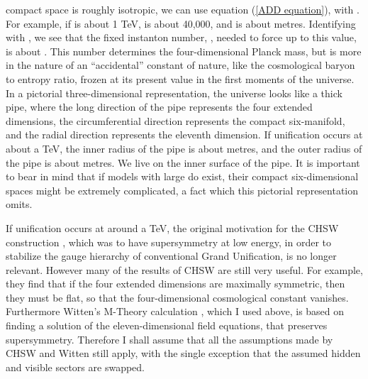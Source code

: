 \documentclass[a4paper,12pt,oneside]{article}
\begin{document}
compact space is roughly isotropic, we can use equation (\ref{ADD equation}),
with \coordHE{}.  For example, if \coordHE{} is 
about 1 TeV, \coordHE{} is about 40,000, and \coordHE{} is 
about \coordHE{} metres.  Identifying \coordHE{} with \coordHE{}, we see
that the fixed instanton number, \coordHE{}, needed to force \coordHE{} up 
to this value, is about \coordHE{}.  This number determines the 
four-dimensional Planck mass, but is more in the nature of an
``accidental'' constant of nature, like the cosmological baryon to
entropy ratio, frozen at its present value in the first moments of
the universe.  In a pictorial three-dimensional representation, the
universe looks like a thick pipe, where the long direction 
of the pipe represents the four extended dimensions, the 
circumferential direction represents the 
compact six-manifold, and the radial direction represents the 
eleventh 
dimension.  If unification occurs at about a TeV, the inner radius 
of the pipe is about \coordHE{} 
metres, and the outer radius of the pipe is about \coordHE{} 
metres.  We live on the inner surface of the pipe.  It is important 
to bear in mind that if models with large \coordHE{} do exist, 
their compact six-dimensional spaces might be extremely complicated,
a fact which this pictorial representation omits.

If unification occurs at around a TeV, the original motivation for
the CHSW construction \cite{CHSW}, which was to have \coordHE{} 
supersymmetry at low energy, in order to stabilize the gauge 
hierarchy of conventional Grand Unification, is no longer relevant.
However many of the results of CHSW are still very useful.
For example, they find that if the four extended dimensions are
maximally symmetric, then they must be flat, so that the 
four-dimensional cosmological constant vanishes.  Furthermore 
Witten's M-Theory calculation \cite{Witten}, which I used above, is
based on finding a solution of the eleven-dimensional field 
equations, that preserves supersymmetry.  Therefore I shall assume
that all the assumptions made by CHSW and Witten still apply, with
the single exception that the assumed hidden and visible sectors are
swapped.
\end{document}

